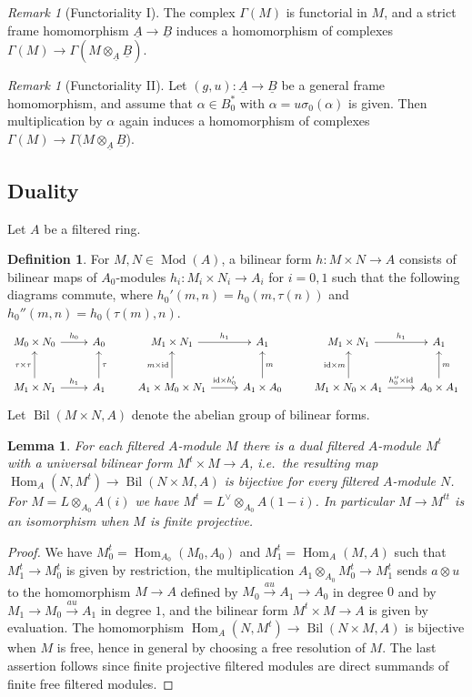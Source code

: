 \documentclass[a4paper,11pt]{amsart}
\theoremstyle{plain}
\newtheorem{Lemma}[equation]{Lemma}
\theoremstyle{definition}
\newtheorem{Defn}[equation]{Definition}
\theoremstyle{remark}
\newtheorem{Remark}[equation]{Remark}
\newcommand{\bLe}{\begin{Lemma}}
\newcommand{\eLe}{\end{Lemma}}
\newcommand{\bDe}{\begin{Defn}}
\newcommand{\eDe}{\end{Defn}}
\newcommand{\bRe}{\begin{Remark}}
\newcommand{\eRe}{\end{Remark}}
\newcommand{\bproof}{\begin{proof}}
\newcommand{\eproof}{\end{proof}}
\renewcommand{\u}{\underline}
\newcommand{\uM}{M} %
\numberwithin{equation}{section}
\DeclareMathOperator{\id}{id}
\DeclareMathOperator{\Bil}{Bil}
\DeclareMathOperator{\Hom}{Hom}
\DeclareMathOperator{\Mod}{Mod}
\begin{document}
\bRe[Functoriality I]
The complex $\Gamma(\uM)$ is functorial in $\uM$, and a strict frame homomorphism $\u A\to\u B$ induces a homomorphism of complexes $\Gamma(\uM)\to\Gamma(\uM\otimes_{\u A}\u B)$.
\eRe

\bRe[Functoriality II]
Let $(g,u):\u A\to \u B$ be a general frame homomorphism, and assume that $\alpha\in B_0^*$ with $\alpha=u\sigma_0(\alpha)$ is given. Then multiplication by $\alpha$ again induces a homomorphism of complexes $\Gamma(\uM)\to\Gamma(\uM\otimes_{\u A}\u B$).
\eRe

\subsection{Duality}

Let $A$ be a filtered ring.

\bDe
For $M,N\in\Mod(A)$, a bilinear form $h:M\times N\to A$ consists of bilinear maps of $A_0$-modules $h_i\colon M_i\times N_i\to A_i$ for $i=0,1$ such that the following diagrams commute,  
where $h_0'(m,n)=h_0(m,\tau (n))$ and $h_0''(m,n)=h_0(\tau (m),n)$.
\[
\xymatrix@M+0.2em{
M_0 \times N_0 \ar[r]^-{h_0} & A_0 \\
M_1\times N_1 \ar[u]^{\tau\times\tau} \ar[r]^-{h_1} & A_1 \ar[u]_\tau
}
\qquad
\xymatrix@M+0.2em{
M_1\times N_1 \ar[r]^-{h_1} & A_1
\\
A_1\times M_0\times N_1 \ar[u]^{m\times\id} \ar[r]^-{{\id}\times h_0'} & A_1 \times A_0 \ar[u]_m
}
\qquad
\xymatrix@M+0.2em{
M_1\times N_1 \ar[r]^-{h_1} & A_1
\\
M_1\times N_0\times A_1 \ar[u]^{{\id}\times m} \ar[r]^-{h_0''\times{\id}} & A_0 \times A_1 \ar[u]_m
}
\]
Let $\Bil(M\times N,A)$ denote the abelian group of bilinear forms.
\eDe

\bLe
\label{Le:dual-filt-module}
For each filtered $A$-module $M$ there is a dual filtered $A$-module $M^t$ with a universal bilinear form $M^t\times M\to A$, i.e.\ the resulting map $\Hom_A(N,M^t)\to\Bil(N\times M,A)$ is bijective for every filtered $A$-module $N$. For $M=L\otimes_{A_0}A(i)$ we have $M^t=L^\vee\otimes_{A_0}A(1-i)$. In particular $M\to M^{tt}$ is an isomorphism when $M$ is finite projective.
\eLe

\bproof
We have $M^t_0=\Hom_{A_0}(M_0,A_0)$ and $M^t_1=\Hom_A(M,A)$ such that $M^t_1\to M^t_0$ is given by restriction, the multiplication $A_1\otimes_{A_0}M^t_0\to M^t_1$ sends $a\otimes u$ to the
homomorphism $M\to A$ defined by $M_0\xrightarrow {au} A_1\to A_0$ in degree $0$ and by $M_1\to M_0\xrightarrow{au}A_1$ in degree $1$, and the bilinear form $M^t\times M\to A$ is given by evaluation. The homomorphism 
$\Hom_A(N,M^t)\to\Bil(N\times M,A)$ is bijective when $M$ is free, hence in general by choosing a free resolution of $M$.
The last assertion follows since finite projective filtered modules are direct summands of finite free filtered modules.
\eproof
\end{document}
